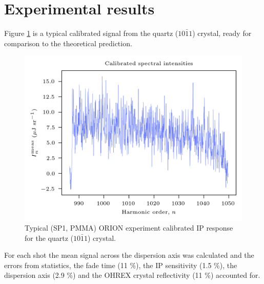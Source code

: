 \section{\label{ch:3-sec:results}Experimental results}

Figure \ref{fig:orionq1011} is a typical calibrated signal from the quartz ($10\bar{1}1$) crystal, ready for comparison to the theoretical prediction.
\begin{figure}
	\centering
	\includegraphics[width=0.7\linewidth]{figures/orion/orion_q1011}
	\caption[Typical ORION experiment calibrated IP response for the quartz ($10\bar{1}1$) crystal.]{Typical (SP1, PMMA) ORION experiment calibrated IP response for the quartz ($10\bar{1}1$) crystal.}
	\label{fig:orionq1011}
\end{figure}
For each shot the mean signal across the dispersion axis was calculated and the errors from statistics, the fade time (11 \%), the IP sensitivity (1.5 \%), the dispersion axis (2.9 \%) and the OHREX crystal reflectivity (11 \%) accounted for.

